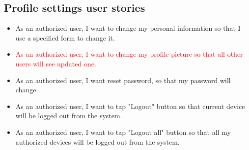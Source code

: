 \subsection{Profile settings user stories}\label{subsec:profile-settings-user-stories}
\begin{itemize}
    \item As an authorized user, I want to change my personal information so that I use a specified form to change it.
    \item \textcolor{red}{As an authorized user, I want to change my profile picture so that all other users will see updated one.}
    \item As an authorized user, I want reset password, so that my password will change.
    \item As an authorized user, I want to tap "Logout" button so that current device will be logged out from the system.
    \item As an authorized user, I want to tap "Logout all" button so that all my authorized devices will be logged out from the system.
\end{itemize}
